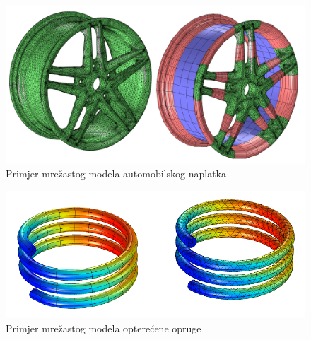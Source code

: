 \documentclass[a4paper,twoside,12pt]{memoir} %
\begin{document}
\begin{figure}[h!t]
\begin{center}
\includegraphics[scale=0.2]{pictures/chapter_fem/Wheel-rim-mesh-example-large.png}
\caption{Primjer mrežastog modela automobilskog naplatka \cite{comslo_mesh}}
\label{fig:mesh_rim}
\end{center}
\end{figure}

\begin{figure}[h!t]
\begin{center}
\includegraphics[scale=0.6]{pictures/chapter_fem/Loaded-spring-example.png}
\caption{Primjer mrežastog modela opterećene opruge \cite{comslo_mesh}}
\label{fig:mesh_spring}
\end{center}
\end{figure}
\end{document}
